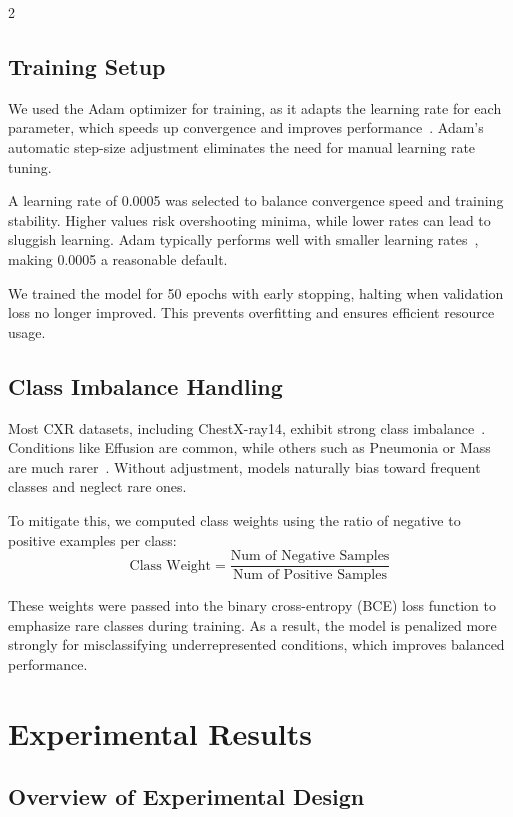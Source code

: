 \documentclass[12pt]{article}
\begin{document}
\begin{multicols}{2}
\subsection{Training Setup}

We used the Adam optimizer for training, as it adapts the learning rate for each parameter, which speeds up convergence and improves performance~\cite{adam}. Adam's automatic step-size adjustment eliminates the need for manual learning rate tuning.

A learning rate of 0.0005 was selected to balance convergence speed and training stability. Higher values risk overshooting minima, while lower rates can lead to sluggish learning. Adam typically performs well with smaller learning rates~\cite{adam}, making 0.0005 a reasonable default.

We trained the model for 50 epochs with early stopping, halting when validation loss no longer improved. This prevents overfitting and ensures efficient resource usage.

\subsection{Class Imbalance Handling}

Most CXR datasets, including ChestX-ray14, exhibit strong class imbalance~\cite{wang2017chestx}. Conditions like Effusion are common, while others such as Pneumonia or Mass are much rarer~\cite{mimic, adam}. Without adjustment, models naturally bias toward frequent classes and neglect rare ones.

To mitigate this, we computed class weights using the ratio of negative to positive examples per class:
\[
\text{Class Weight} = \frac{\text{Num of Negative Samples}}{\text{Num of Positive Samples}}
\]

These weights were passed into the binary cross-entropy (BCE) loss function to emphasize rare classes during training. As a result, the model is penalized more strongly for misclassifying underrepresented conditions, which improves balanced performance.

\section{Experimental Results}

\subsection{Overview of Experimental Design}


\end{multicols}
\end{document}

